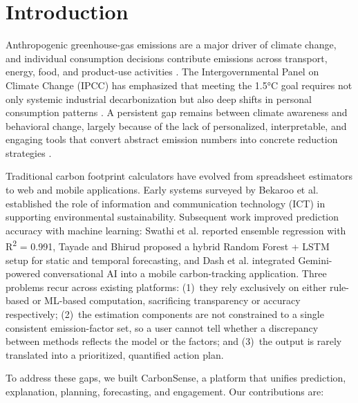 \documentclass[conference]{IEEEtran}
\begin{document}
\section{Introduction}

Anthropogenic greenhouse-gas emissions are a major driver of climate change, and individual consumption decisions contribute emissions across transport, energy, food, and product-use activities \cite{swathi2025}. The Intergovernmental Panel on Climate Change (IPCC) has emphasized that meeting the 1.5°C goal requires not only systemic industrial decarbonization but also deep shifts in personal consumption patterns \cite{ipcc2022}. A persistent gap remains between climate awareness and behavioral change, largely because of the lack of personalized, interpretable, and engaging tools that convert abstract emission numbers into concrete reduction strategies \cite{mulrow2019}.

Traditional carbon footprint calculators have evolved from spreadsheet estimators to web and mobile applications. Early systems surveyed by Bekaroo et al. \cite{bekaroo2020} established the role of information and communication technology (ICT) in supporting environmental sustainability. Subsequent work improved prediction accuracy with machine learning: Swathi et al. \cite{swathi2025} reported ensemble regression with R\textsuperscript{2} = 0.991, Tayade and Bhirud \cite{tayade2025} proposed a hybrid Random Forest + LSTM setup for static and temporal forecasting, and Dash et al. \cite{dash2025} integrated Gemini-powered conversational AI into a mobile carbon-tracking application. Three problems recur across existing platforms: (1)~they rely exclusively on either rule-based or ML-based computation, sacrificing transparency or accuracy respectively; (2)~the estimation components are not constrained to a single consistent emission-factor set, so a user cannot tell whether a discrepancy between methods reflects the model or the factors; and (3)~the output is rarely translated into a prioritized, quantified action plan.

To address these gaps, we built CarbonSense, a platform that unifies prediction, explanation, planning, forecasting, and engagement. Our contributions are:
\end{document}
